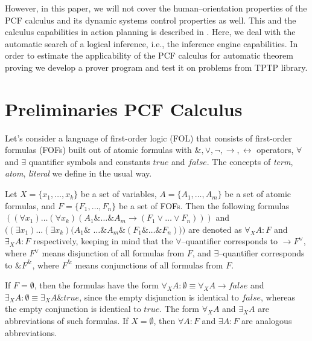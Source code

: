 \documentclass[runningheads,a4paper]{llncs}
\begin{document}
However, in this paper, we will not cover the human--orientation properties of the PCF calculus and its dynamic systems control properties as well.  This and the calculus capabilities in action planning is described in \cite{ICDS2000}.   Here, we deal with the automatic search of a logical inference, i.e., the inference engine capabilities.  In order to estimate the applicability of the PCF calculus for automatic theorem proving we develop a prover program and test it on problems from TPTP library.



\section{Preliminaries PCF Calculus}

Let's consider a language of first-order logic (FOL) that consists of first-order formulas (FOFs) built out of atomic formulas with $\&, \vee, \neg, \rightarrow, \leftrightarrow$ operators, $\forall$ and $\exists$ quantifier symbols and constants $true$ and $false$.  The concepts of \emph{term}, \emph{atom}, \emph{literal} we define in the usual way.

Let $X = \{x_1,\ldots,x_k\}$ be a set of variables, $A = \{A_1,\ldots,A_m\}$ be a set of atomic formulas, and $F = \{F_1,\ldots,F_n\}$ be a set of FOFs. Then the following formulas $((\forall x_1) \ldots (\forall x_k) (A_1 \& \ldots \& A_m \rightarrow (F_1 \vee \ldots \vee F_n)))$ and $((\exists x_1) \ldots (\exists x_k) (A_1 \&$ $\ldots \& A_m \& (F_1 \& \ldots \& F_n)))$ are denoted as  $\forall_XA\colon F$ and $\exists_XA\colon F$ respectively, keeping in mind that the $\forall$--quantifier corresponds to $\rightarrow F^{\vee}$, where $F^{\vee}$ means disjunction of all formulas from $F$, and $\exists$--quantifier corresponds to $\& F^{\&}$, where $F^{\&}$ means conjunctions of all formulas from $F$.

If $F = \emptyset$, then the formulas have the form $\forall_XA\colon\emptyset \equiv \forall_XA \rightarrow false$ and $\exists_XA\colon\emptyset \equiv \exists_XA \& true$, since the empty disjunction is identical to $false$, whereas the empty conjunction is identical to $true$.  The form $\forall_XA$ and $\exists_XA$ are abbreviations of such formulas.  If $X = \emptyset$, then $\forall A\colon F$ and $\exists A\colon F$ are analogous abbreviations.
\end{document}
